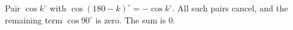 Pair $\cos k^\circ$ with $\cos(180-k)^\circ=-\cos k^\circ$. All such pairs cancel, and the remaining term $\cos90^\circ$ is zero. The sum is $\boxed0$.
